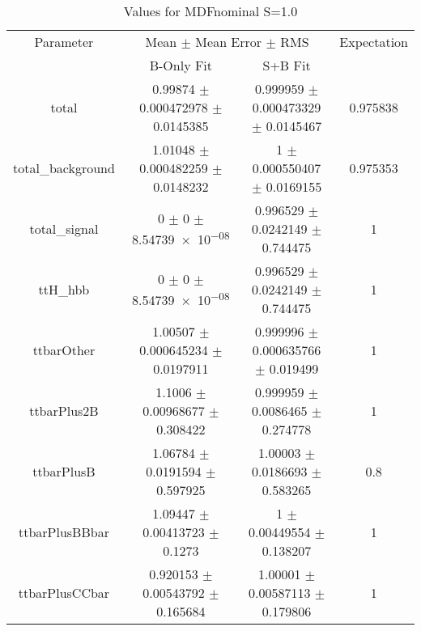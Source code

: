 \begin{table}
\centering
\caption{Values for MDFnominal S=1.0}
\begin{tabular}{cccc}
\toprule
Parameter & \multicolumn{2}{c}{Mean $\pm$ Mean Error $\pm$ RMS} & Expectation\\
 & B-Only Fit & S+B Fit & \\
\midrule
total & \num{0.99874} $\pm$ \num{0.000472978} $\pm$ \num{0.0145385} & \num{0.999959} $\pm$ \num{0.000473329} $\pm$ \num{0.0145467} & \num{0.975838}\\
total\_background & \num{1.01048} $\pm$ \num{0.000482259} $\pm$ \num{0.0148232} & \num{1} $\pm$ \num{0.000550407} $\pm$ \num{0.0169155} & \num{0.975353}\\
total\_signal & \num{0} $\pm$ \num{0} $\pm$ \num{8.54739e-08} & \num{0.996529} $\pm$ \num{0.0242149} $\pm$ \num{0.744475} & \num{1}\\
ttH\_hbb & \num{0} $\pm$ \num{0} $\pm$ \num{8.54739e-08} & \num{0.996529} $\pm$ \num{0.0242149} $\pm$ \num{0.744475} & \num{1}\\
ttbarOther & \num{1.00507} $\pm$ \num{0.000645234} $\pm$ \num{0.0197911} & \num{0.999996} $\pm$ \num{0.000635766} $\pm$ \num{0.019499} & \num{1}\\
ttbarPlus2B & \num{1.1006} $\pm$ \num{0.00968677} $\pm$ \num{0.308422} & \num{0.999959} $\pm$ \num{0.0086465} $\pm$ \num{0.274778} & \num{1}\\
ttbarPlusB & \num{1.06784} $\pm$ \num{0.0191594} $\pm$ \num{0.597925} & \num{1.00003} $\pm$ \num{0.0186693} $\pm$ \num{0.583265} & \num{0.8}\\
ttbarPlusBBbar & \num{1.09447} $\pm$ \num{0.00413723} $\pm$ \num{0.1273} & \num{1} $\pm$ \num{0.00449554} $\pm$ \num{0.138207} & \num{1}\\
ttbarPlusCCbar & \num{0.920153} $\pm$ \num{0.00543792} $\pm$ \num{0.165684} & \num{1.00001} $\pm$ \num{0.00587113} $\pm$ \num{0.179806} & \num{1}\\
\bottomrule
\end{tabular}
\end{table}